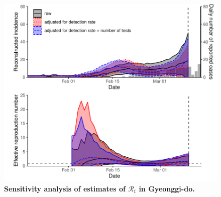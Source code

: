\documentclass[12pt]{article}
\begin{document}
\pagebreak

\begin{figure}[!ht]
\includegraphics[width=\textwidth]{figure_R_t_gyeonggi.pdf}
\caption{
\textbf{Sensitivity analysis of estimates of $\mathcal R_t$ in Gyeonggi-do.}
}
\end{figure}
\end{document}
